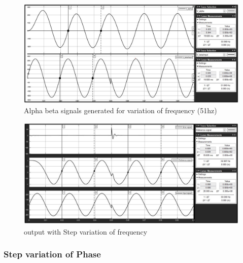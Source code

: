 \documentclass[a4paper,12pt]{iitmdiss}
\begin{document}
\begin{figure}[hbt!]
    \centering
    \includegraphics[width=1.0\textwidth]{alhpa_beta (51hz).jpg}
    \caption{Alpha beta signals generated for variation of frequency (51hz)}
\end{figure}


\begin{figure}[hbt!]
    \centering
    \includegraphics[width=1.0\textwidth]{Output.jpg}
    \caption{output with Step variation of frequency}
\end{figure}


\subsubsection{Step variation of Phase}
\end{document}
